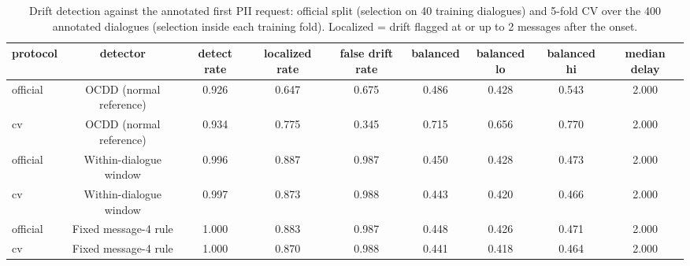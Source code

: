 \begin{table}[htbp]
\centering
\caption{Drift detection against the annotated first PII request: official split (selection on 40 training dialogues) and 5-fold CV over the 400 annotated dialogues (selection inside each training fold). Localized = drift flagged at or up to 2 messages after the onset.}
\label{tab:table4_drift_detection}
\small
\begin{tabular}{lcccccccc}
\toprule
\textbf{protocol} & \textbf{detector} & \textbf{detect rate} & \textbf{localized rate} & \textbf{false drift rate} & \textbf{balanced} & \textbf{balanced lo} & \textbf{balanced hi} & \textbf{median delay} \\
\midrule
official & OCDD (normal reference) & 0.926 & 0.647 & 0.675 & 0.486 & 0.428 & 0.543 & 2.000 \\
cv & OCDD (normal reference) & 0.934 & 0.775 & 0.345 & 0.715 & 0.656 & 0.770 & 2.000 \\
official & Within-dialogue window & 0.996 & 0.887 & 0.987 & 0.450 & 0.428 & 0.473 & 2.000 \\
cv & Within-dialogue window & 0.997 & 0.873 & 0.988 & 0.443 & 0.420 & 0.466 & 2.000 \\
official & Fixed message-4 rule & 1.000 & 0.883 & 0.987 & 0.448 & 0.426 & 0.471 & 2.000 \\
cv & Fixed message-4 rule & 1.000 & 0.870 & 0.988 & 0.441 & 0.418 & 0.464 & 2.000 \\
\bottomrule
\end{tabular}
\end{table}